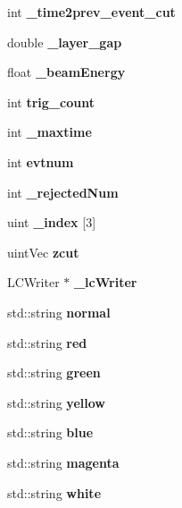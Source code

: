 \begin{DoxyCompactItemize}
\item 
int {\bfseries \-\_\-time2prev\-\_\-event\-\_\-cut}\label{classTriventProc_ab300480569003a54edd34c46a63f9df4}

\item 
double {\bfseries \-\_\-layer\-\_\-gap}\label{classTriventProc_ac507176dcf02b0a8db304160ce93d63f}

\item 
float {\bfseries \-\_\-beam\-Energy}\label{classTriventProc_a1ae26de8044b04d845295bdb6ea00ae7}

\item 
int {\bfseries trig\-\_\-count}\label{classTriventProc_a77891bb090308eb5d8b57cacf06ab3c0}

\item 
int {\bfseries \-\_\-maxtime}\label{classTriventProc_aeb72fee6e655dd84b6c2142b6562ec44}

\item 
int {\bfseries evtnum}\label{classTriventProc_a7cd0658f8c4162a4b2039df7fde4c2d8}

\item 
int {\bfseries \-\_\-rejected\-Num}\label{classTriventProc_ae62a20b0357ddf5d24f6de3f9c2dd51c}

\item 
uint {\bfseries \-\_\-index} [3]\label{classTriventProc_a2966485d1996f86059e87d7b3ff419c9}

\item 
uint\-Vec {\bfseries zcut}\label{classTriventProc_ab77125d891b8f57baca23c74afdf40be}

\item 
L\-C\-Writer $\ast$ {\bfseries \-\_\-lc\-Writer}\label{classTriventProc_a5e80a938f23a70dc9a95f65903f04701}

\item 
std\-::string {\bfseries normal}\label{classTriventProc_af85b2772af2664fa71473108a7dc6bd7}

\item 
std\-::string {\bfseries red}\label{classTriventProc_ade637760722fa4dc9c4b36a2ce529027}

\item 
std\-::string {\bfseries green}\label{classTriventProc_a13a6d20c018fbf3ff83b28e5c8d3cbb4}

\item 
std\-::string {\bfseries yellow}\label{classTriventProc_a6659601453b91c2db5437e431e39ddd7}

\item 
std\-::string {\bfseries blue}\label{classTriventProc_af12ed889606a5daae796500684995b8c}

\item 
std\-::string {\bfseries magenta}\label{classTriventProc_a9a5ee47f38a27a4c8cfbeb8c1922cda8}

\item 
std\-::string {\bfseries white}\label{classTriventProc_a4a6754865dbcaadd651aaf674d5e0134}

\end{DoxyCompactItemize}


